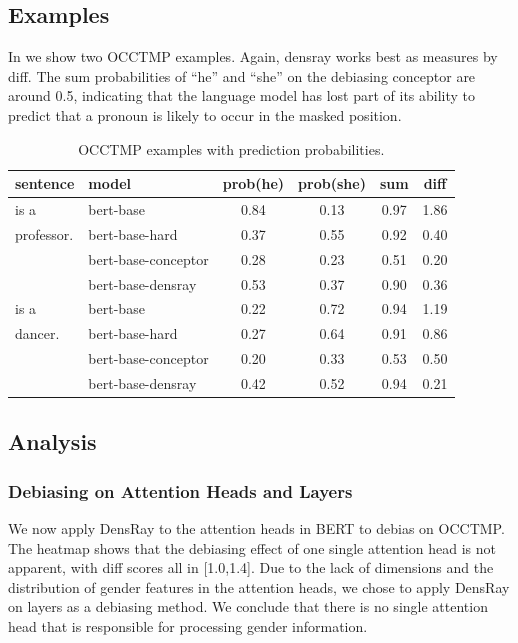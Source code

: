 \subsection{Examples}
In  we show two OCCTMP examples.
Again, densray works best as measures by diff.
The sum probabilities of ``he'' and ``she''
on the debiasing conceptor are around 0.5, indicating that
the
language model has lost part of its ability to predict that 
a pronoun is  likely to occur in the masked position.
\begin{table}[h]
	\centering
	\footnotesize
	\begin{tabular}{llcccc}
		\hline
		sentence & model & prob(he) & prob(she) &sum&diff\\
		\hline
		[MASK] is a & bert-base & 0.84 & 0.13&0.97&1.86\\
		professor.& bert-base-hard& 0.37 & 0.55&0.92&0.40\\
		& bert-base-conceptor& 0.28 & 0.23&0.51&{0.20}\\
		& bert-base-densray & 0.53 & 0.37&0.90&0.36\\
		\hline
		[MASK] is a & bert-base & 0.22 & 0.72&0.94&1.19\\
		dancer.  & bert-base-hard& 0.27 & 0.64&0.91&0.86\\
		& bert-base-conceptor& 0.20 & 0.33&0.53&0.50\\
		& bert-base-densray& 0.42 & 0.52&0.94&0.21\\
		\hline
	\end{tabular}
	\caption{
		OCCTMP examples with prediction probabilities.}
\end{table}


\subsection{Analysis}

\subsubsection*{Debiasing on Attention Heads and Layers}
We now apply DensRay to the attention heads in BERT to debias on OCCTMP. The heatmap  shows that the debiasing effect of one single attention head is not apparent, with diff scores all in [1.0,1.4]. Due to the lack of dimensions and the distribution of gender features in the attention heads, we chose to apply DensRay on layers as a debiasing method. We conclude that there is no single attention head that is responsible for processing gender information.

